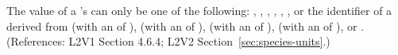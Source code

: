 The value of a \Species's   can only be one of
the following: , , , ,
, , or the identifier of a
\UnitDefinition derived from  (with an  of
),  (with an  of ), 
(with an  of ),  (with an
 of ), or .  (References: L2V1
Section 4.6.4; L2V2 Section~\ref{sec:species-units}.)
